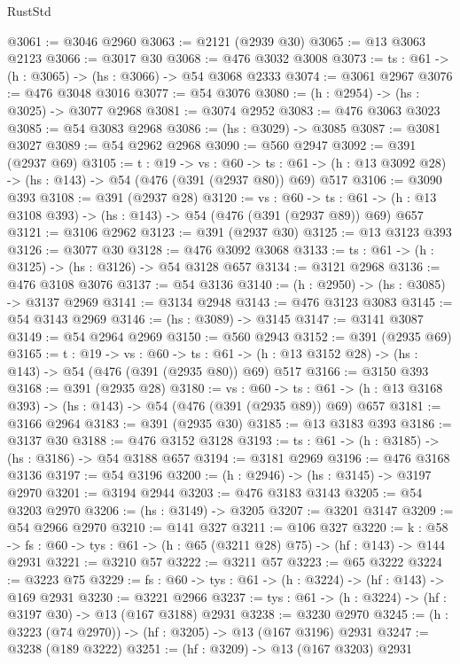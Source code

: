 \begin{lexlean}{RustStd}
\begin{coremodule}
@3061 := @3046 @2960
@3063 := @2121 (@2939 @30)
@3065 := @13 @3063 @2123
@3066 := @3017 @30
@3068 := @476 @3032 @3008
@3073 := {ts : @61} -> (h : @3065) -> (hs : @3066) -> @54 @3068 @2333
@3074 := @3061 @2967
@3076 := @476 @3048 @3016
@3077 := @54 @3076
@3080 := (h : @2954) -> (hs : @3025) -> @3077 @2968
@3081 := @3074 @2952
@3083 := @476 @3063 @3023
@3085 := @54 @3083 @2968
@3086 := (hs : @3029) -> @3085
@3087 := @3081 @3027
@3089 := @54 @2962 @2968
@3090 := @560 @2947
@3092 := @391 (@2937 @69)
@3105 := {t : @19} ->
  {vs : @60} ->
  {ts : @61} -> (h : @13 @3092 @28) -> (hs : @143) -> @54 (@476 (@391 (@2937 @80)) @69) @517
@3106 := @3090 @393
@3108 := @391 (@2937 @28)
@3120 := {vs : @60} ->
  {ts : @61} -> (h : @13 @3108 @393) -> (hs : @143) -> @54 (@476 (@391 (@2937 @89)) @69) @657
@3121 := @3106 @2962
@3123 := @391 (@2937 @30)
@3125 := @13 @3123 @393
@3126 := @3077 @30
@3128 := @476 @3092 @3068
@3133 := {ts : @61} -> (h : @3125) -> (hs : @3126) -> @54 @3128 @657
@3134 := @3121 @2968
@3136 := @476 @3108 @3076
@3137 := @54 @3136
@3140 := (h : @2950) -> (hs : @3085) -> @3137 @2969
@3141 := @3134 @2948
@3143 := @476 @3123 @3083
@3145 := @54 @3143 @2969
@3146 := (hs : @3089) -> @3145
@3147 := @3141 @3087
@3149 := @54 @2964 @2969
@3150 := @560 @2943
@3152 := @391 (@2935 @69)
@3165 := {t : @19} ->
  {vs : @60} ->
  {ts : @61} -> (h : @13 @3152 @28) -> (hs : @143) -> @54 (@476 (@391 (@2935 @80)) @69) @517
@3166 := @3150 @393
@3168 := @391 (@2935 @28)
@3180 := {vs : @60} ->
  {ts : @61} -> (h : @13 @3168 @393) -> (hs : @143) -> @54 (@476 (@391 (@2935 @89)) @69) @657
@3181 := @3166 @2964
@3183 := @391 (@2935 @30)
@3185 := @13 @3183 @393
@3186 := @3137 @30
@3188 := @476 @3152 @3128
@3193 := {ts : @61} -> (h : @3185) -> (hs : @3186) -> @54 @3188 @657
@3194 := @3181 @2969
@3196 := @476 @3168 @3136
@3197 := @54 @3196
@3200 := (h : @2946) -> (hs : @3145) -> @3197 @2970
@3201 := @3194 @2944
@3203 := @476 @3183 @3143
@3205 := @54 @3203 @2970
@3206 := (hs : @3149) -> @3205
@3207 := @3201 @3147
@3209 := @54 @2966 @2970
@3210 := @141 @327
@3211 := @106 @327
@3220 := {k : @58} ->
  {fs : @60} -> {tys : @61} -> (h : @65 (@3211 @28) @75) -> (hf : @143) -> @144 @2931
@3221 := @3210 @57
@3222 := @3211 @57
@3223 := @65 @3222
@3224 := @3223 @75
@3229 := {fs : @60} -> {tys : @61} -> (h : @3224) -> (hf : @143) -> @169 @2931
@3230 := @3221 @2966
@3237 := {tys : @61} -> (h : @3224) -> (hf : @3197 @30) -> @13 (@167 @3188) @2931
@3238 := @3230 @2970
@3245 := (h : @3223 (@74 @2970)) -> (hf : @3205) -> @13 (@167 @3196) @2931
@3247 := @3238 (@189 @3222)
@3251 := (hf : @3209) -> @13 (@167 @3203) @2931

\end{coremodule}
\end{lexlean}
